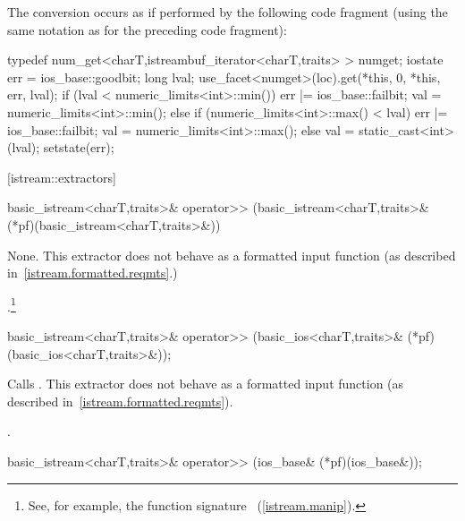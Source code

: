 \begin{itemdescr}
\pnum
The conversion occurs as if performed by the following code fragment
(using the same notation as for the preceding code fragment):
\begin{codeblock}
typedef num_get<charT,istreambuf_iterator<charT,traits> > numget;
iostate err = ios_base::goodbit;
long lval;
use_facet<numget>(loc).get(*this, 0, *this, err, lval);
if (lval < numeric_limits<int>::min()) {
  err |= ios_base::failbit;
  val = numeric_limits<int>::min();
} else if (numeric_limits<int>::max() < lval) {
  err |= ios_base::failbit;
  val = numeric_limits<int>::max();
}  else
  val = static_cast<int>(lval);
setstate(err);
\end{codeblock}
\end{itemdescr}

[istream::extractors]{}

%
\begin{itemdecl}
basic_istream<charT,traits>& operator>>
    (basic_istream<charT,traits>& (*pf)(basic_istream<charT,traits>&))
\end{itemdecl}

\begin{itemdescr}
\pnum
\effects
None.
This extractor does not behave as a formatted input function
(as described in~\ref{istream.formatted.reqmts}.)

\pnum
\returns
{}.\footnote{See, for example, the function signature
~(\ref{istream.manip}).%
}
\end{itemdescr}

%
\begin{itemdecl}
basic_istream<charT,traits>& operator>>
    (basic_ios<charT,traits>& (*pf)(basic_ios<charT,traits>&));
\end{itemdecl}

\begin{itemdescr}
\pnum
\effects
Calls
.
This extractor does not behave as a formatted input function
(as described in~\ref{istream.formatted.reqmts}).

\pnum
\returns
{}.
\end{itemdescr}

%
\begin{itemdecl}
basic_istream<charT,traits>& operator>>
    (ios_base& (*pf)(ios_base&));
\end{itemdecl}

